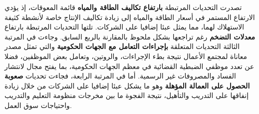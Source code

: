 تصدرت التحديات المرتبطة \textbf{بارتفاع تكاليف الطاقة والمياه} قائمة المعوقات، إذ يؤدي الارتفاع المستمر في أسعار الطاقة والمياه إلى زيادة تكاليف الإنتاج خاصة لأنشطة كثيفة الاستهلاك لهما، مما يمثل عبئا إضافيا على الشركات. تلتها التحديات المرتبطة بارتفاع \textbf{معدلات التضخم} رغم تراجعها بشكل ملحوظ بالمقارنة بالربع السابق. وجاءت في المرتبة الثالثة التحديات المتعلقة \textbf{بإجراءات التعامل مع الجهات الحكومية} والتي تمثل مصدر معاناة لمجتمع الأعمال نتيجة بطء الإجراءات، والروتين، وتعامل بعض الموظفين، فضلا عن تعدد موظفي الضبطية القضائية في معظم الجهات الحكومية، بما يفتح مجال لانتشار الفساد والمصروفات غير الرسمية. أما في المرتبة الرابعة، فجاءت تحديات \textbf{صعوبة الحصول على العمالة المؤهلة} وهو ما يشكل عبئا إضافيا على الشركات من خلال زيادة إنفاقها على التدريب والتأهيل، نتيجة الفجوة ما بين مخرجات منظومة التعليم والتدريب واحتياجات سوق العمل.
